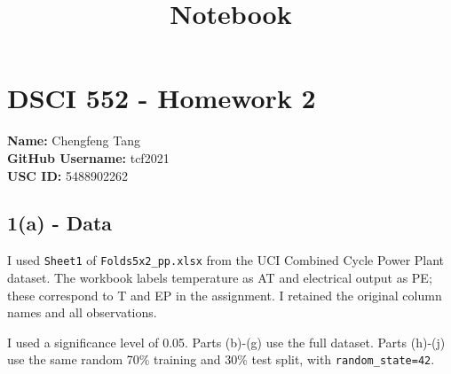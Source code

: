 \documentclass[11pt]{article}
\title{Notebook}
\begin{document}
    
    \setcounter{secnumdepth}{0}
    
    

    
    \hypertarget{dsci-552---homework-2}{%
\section{DSCI 552 - Homework 2}\label{dsci-552---homework-2}}

\textbf{Name:} Chengfeng Tang\\
\textbf{GitHub Username:} tcf2021\\
\textbf{USC ID:} 5488902262

    \hypertarget{a---data}{%
\subsection{1(a) - Data}\label{a---data}}

I used \texttt{Sheet1} of \texttt{Folds5x2\_pp.xlsx} from the UCI
Combined Cycle Power Plant dataset. The workbook labels temperature as
AT and electrical output as PE; these correspond to T and EP in the
assignment. I retained the original column names and all observations.

I used a significance level of 0.05. Parts (b)-(g) use the full dataset.
Parts (h)-(j) use the same random 70\% training and 30\% test split,
with \texttt{random\_state=42}.
\end{document}

